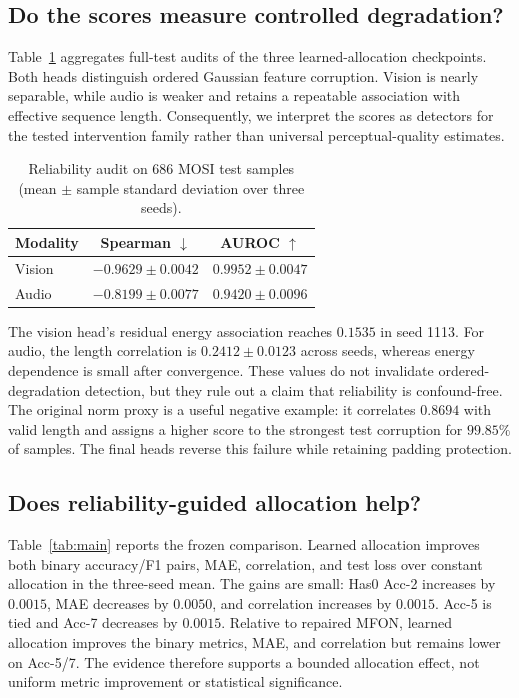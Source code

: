 \documentclass{article}
\begin{document}
\subsection{Do the scores measure controlled degradation?}

Table~\ref{tab:audit} aggregates full-test audits of the three learned-allocation checkpoints. Both heads distinguish ordered Gaussian feature corruption. Vision is nearly separable, while audio is weaker and retains a repeatable association with effective sequence length. Consequently, we interpret the scores as detectors for the tested intervention family rather than universal perceptual-quality estimates.

\begin{table}[t]
\caption{Reliability audit on 686 MOSI test samples (mean $\pm$ sample standard deviation over three seeds).}
\label{tab:audit}
\centering
\small
\setlength{\tabcolsep}{4pt}
\begin{tabular}{lcc}
\toprule
Modality & Spearman $\downarrow$ & AUROC $\uparrow$ \\
\midrule
Vision & $-0.9629\pm0.0042$ & $0.9952\pm0.0047$ \\
Audio  & $-0.8199\pm0.0077$ & $0.9420\pm0.0096$ \\
\bottomrule
\end{tabular}
\end{table}

The vision head's residual energy association reaches $0.1535$ in seed 1113. For audio, the length correlation is $0.2412\pm0.0123$ across seeds, whereas energy dependence is small after convergence. These values do not invalidate ordered-degradation detection, but they rule out a claim that reliability is confound-free. The original norm proxy is a useful negative example: it correlates $0.8694$ with valid length and assigns a higher score to the strongest test corruption for $99.85\%$ of samples. The final heads reverse this failure while retaining padding protection.

\subsection{Does reliability-guided allocation help?}

Table~\ref{tab:main} reports the frozen comparison. Learned allocation improves both binary accuracy/F1 pairs, MAE, correlation, and test loss over constant allocation in the three-seed mean. The gains are small: Has0 Acc-2 increases by $0.0015$, MAE decreases by $0.0050$, and correlation increases by $0.0015$. Acc-5 is tied and Acc-7 decreases by $0.0015$. Relative to repaired MFON, learned allocation improves the binary metrics, MAE, and correlation but remains lower on Acc-5/7. The evidence therefore supports a bounded allocation effect, not uniform metric improvement or statistical significance.
\end{document}
